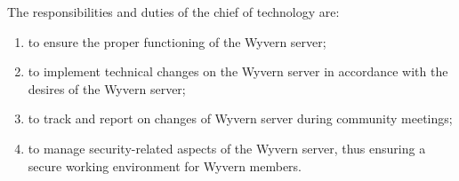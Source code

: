 \begin{enumerate}
    \begin{item}
        The responsibilities and duties of the chief of technology are:
        \begin{enumerate}
            \item to ensure the proper functioning of the Wyvern server;
            \item to implement technical changes on the Wyvern server in accordance with the desires of the Wyvern server;
            \item to track and report on changes of Wyvern server during community meetings;
            \item to manage security-related aspects of the Wyvern server, thus ensuring a secure working environment for Wyvern members.
        \end{enumerate}
    \end{item}
\end{enumerate}

